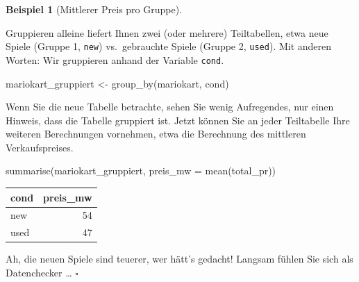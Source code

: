 \documentclass[
  letterpaper,
  oneside,
  open=any]{scrbook}
\newenvironment{Shaded}{\begin{snugshade}}{\end{snugshade}}
\newcommand{\AttributeTok}[1]{\textcolor[rgb]{0.40,0.45,0.13}{#1}}
\newcommand{\FunctionTok}[1]{\textcolor[rgb]{0.28,0.35,0.67}{#1}}
\newcommand{\NormalTok}[1]{\textcolor[rgb]{0.00,0.23,0.31}{#1}}
\newcommand{\OtherTok}[1]{\textcolor[rgb]{0.00,0.23,0.31}{#1}}
\theoremstyle{definition}
\theoremstyle{definition}
\newtheorem{example}{Beispiel}[chapter]
\theoremstyle{definition}
\theoremstyle{remark}
\begin{document}
\begin{example}[Mittlerer Preis pro
Gruppe]\protect\hypertarget{exm-groupby}{}\label{exm-groupby}

Gruppieren alleine liefert Ihnen zwei (oder mehrere) Teiltabellen, etwa
neue Spiele (Gruppe 1, \texttt{new}) vs.~gebrauchte Spiele (Gruppe 2,
\texttt{used}). Mit anderen Worten: Wir gruppieren anhand der Variable
\texttt{cond}.

\begin{Shaded}
\begin{Highlighting}[]
\NormalTok{mariokart\_gruppiert }\OtherTok{\textless{}{-}} \FunctionTok{group\_by}\NormalTok{(mariokart, cond)}
\end{Highlighting}
\end{Shaded}

Wenn Sie die neue Tabelle betrachte, sehen Sie wenig Aufregendes, nur
einen Hinweis, dass die Tabelle gruppiert ist. Jetzt können Sie an jeder
Teiltabelle Ihre weiteren Berechnungen vornehmen, etwa die Berechnung
des mittleren Verkaufspreises.

\begin{Shaded}
\begin{Highlighting}[]
\FunctionTok{summarise}\NormalTok{(mariokart\_gruppiert, }\AttributeTok{preis\_mw =} \FunctionTok{mean}\NormalTok{(total\_pr))}
\end{Highlighting}
\end{Shaded}

\begin{longtable}[]{@{}lr@{}}
\toprule\noalign{}
cond & preis\_mw \\
\midrule\noalign{}
\endhead
\bottomrule\noalign{}
\endlastfoot
new & 54 \\
used & 47 \\
\end{longtable}

Ah, die neuen Spiele sind teuerer, wer hätt's gedacht! Langsam fühlen
Sie sich als Datenchecker \ldots{} \(\square\)

\end{example}
\end{document}
